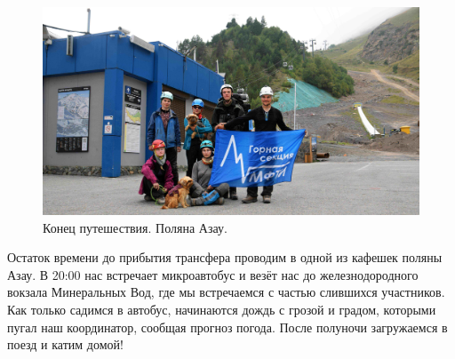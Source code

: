 \begin{figure}[h!]
	\centering
	\includegraphics[width=0.7\linewidth]{../pics/group_finish.jpg}
	\caption{Конец путешествия. Поляна Азау.}
	\label{fig:group_finish}
\end{figure}

Остаток времени до прибытия трансфера проводим в одной из кафешек поляны Азау.
В 20:00 нас встречает микроавтобус и везёт нас до железнодородного вокзала Минеральных Вод, где мы встречаемся с частью слившихся участников. Как только садимся в автобус, начинаются дождь с грозой и градом, которыми пугал наш координатор, сообщая прогноз погода. После полуночи загружаемся в поезд и катим домой!

\clearpage